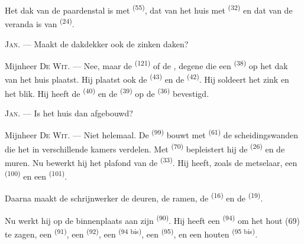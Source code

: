 
Het dak van de paardenstal is met  \textsuperscript{(55)}, dat van
het huis met  \textsuperscript{(32)} en dat van de veranda is van 
\textsuperscript{(24)}.

\textsc{Jan}. --- Maakt de dakdekker ook de zinken daken?

Mijnheer \textsc{De Wit}. --- Nee, maar de  \textsuperscript{(121)} of de
, degene die een
 \textsuperscript{(38)} op het dak van het huis plaatst. Hij
plaatst ook de  \textsuperscript{(43)} en de
 \textsuperscript{(42)}. Hij soldeert het zink en het blik. Hij
heeft de  \textsuperscript{(40)} en de
 \textsuperscript{(39)} op de 
\textsuperscript{(36)} bevestigd.

\textsc{Jan}. --- Is het huis dan afgebouwd?

\VUsaut{3.0mm}
\VUsaut{3.0mm}

Mijnheer \textsc{De Wit}. --- Niet helemaal. De  \textsuperscript{(99)}
bouwt met  \textsuperscript{(61)} de scheidingswanden die het in
verschillende kamers verdelen. Met  \textsuperscript{(70)} bepleistert hij de
 \textsuperscript{(26)} en de muren. Nu bewerkt hij het plafond van de
 \textsuperscript{(33)}. Hij heeft, zoals de metselaar, een 
\textsuperscript{(100)} en een  \textsuperscript{(101)}.

Daarna maakt de schrijnwerker de deuren, de ramen, de 
\textsuperscript{(16)} en de  \textsuperscript{(19)}.

Nu werkt hij op de binnenplaats aan zijn  \textsuperscript{(90)}. Hij heeft
een  \textsuperscript{(94)} om het hout (69) te zagen, een 
\textsuperscript{(91)}, een
 \textsuperscript{(92)}, een 
\textsuperscript{(94 bis)}, een  \textsuperscript{(95)}, en een houten
 \textsuperscript{(95 bis)}.

